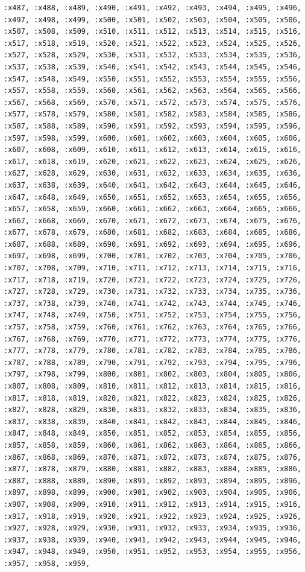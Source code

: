 \documentclass{article}
\begin{document}
\begin{lstlisting}
:x487, :x488, :x489, :x490, :x491, :x492, :x493, :x494, :x495, :x496, :x497, :x498, :x499, :x500, :x501, :x502, :x503, :x504, :x505, :x506, :x507, :x508, :x509, :x510, :x511, :x512, :x513, :x514, :x515, :x516, :x517, :x518, :x519, :x520, :x521, :x522, :x523, :x524, :x525, :x526, :x527, :x528, :x529, :x530, :x531, :x532, :x533, :x534, :x535, :x536, :x537, :x538, :x539, :x540, :x541, :x542, :x543, :x544, :x545, :x546, :x547, :x548, :x549, :x550, :x551, :x552, :x553, :x554, :x555, :x556, :x557, :x558, :x559, :x560, :x561, :x562, :x563, :x564, :x565, :x566, :x567, :x568, :x569, :x570, :x571, :x572, :x573, :x574, :x575, :x576, :x577, :x578, :x579, :x580, :x581, :x582, :x583, :x584, :x585, :x586, :x587, :x588, :x589, :x590, :x591, :x592, :x593, :x594, :x595, :x596, :x597, :x598, :x599, :x600, :x601, :x602, :x603, :x604, :x605, :x606, :x607, :x608, :x609, :x610, :x611, :x612, :x613, :x614, :x615, :x616, :x617, :x618, :x619, :x620, :x621, :x622, :x623, :x624, :x625, :x626, :x627, :x628, :x629, :x630, :x631, :x632, :x633, :x634, :x635, :x636, :x637, :x638, :x639, :x640, :x641, :x642, :x643, :x644, :x645, :x646, :x647, :x648, :x649, :x650, :x651, :x652, :x653, :x654, :x655, :x656, :x657, :x658, :x659, :x660, :x661, :x662, :x663, :x664, :x665, :x666, :x667, :x668, :x669, :x670, :x671, :x672, :x673, :x674, :x675, :x676, :x677, :x678, :x679, :x680, :x681, :x682, :x683, :x684, :x685, :x686, :x687, :x688, :x689, :x690, :x691, :x692, :x693, :x694, :x695, :x696, :x697, :x698, :x699, :x700, :x701, :x702, :x703, :x704, :x705, :x706, :x707, :x708, :x709, :x710, :x711, :x712, :x713, :x714, :x715, :x716, :x717, :x718, :x719, :x720, :x721, :x722, :x723, :x724, :x725, :x726, :x727, :x728, :x729, :x730, :x731, :x732, :x733, :x734, :x735, :x736, :x737, :x738, :x739, :x740, :x741, :x742, :x743, :x744, :x745, :x746, :x747, :x748, :x749, :x750, :x751, :x752, :x753, :x754, :x755, :x756, :x757, :x758, :x759, :x760, :x761, :x762, :x763, :x764, :x765, :x766, :x767, :x768, :x769, :x770, :x771, :x772, :x773, :x774, :x775, :x776, :x777, :x778, :x779, :x780, :x781, :x782, :x783, :x784, :x785, :x786, :x787, :x788, :x789, :x790, :x791, :x792, :x793, :x794, :x795, :x796, :x797, :x798, :x799, :x800, :x801, :x802, :x803, :x804, :x805, :x806, :x807, :x808, :x809, :x810, :x811, :x812, :x813, :x814, :x815, :x816, :x817, :x818, :x819, :x820, :x821, :x822, :x823, :x824, :x825, :x826, :x827, :x828, :x829, :x830, :x831, :x832, :x833, :x834, :x835, :x836, :x837, :x838, :x839, :x840, :x841, :x842, :x843, :x844, :x845, :x846, :x847, :x848, :x849, :x850, :x851, :x852, :x853, :x854, :x855, :x856, :x857, :x858, :x859, :x860, :x861, :x862, :x863, :x864, :x865, :x866, :x867, :x868, :x869, :x870, :x871, :x872, :x873, :x874, :x875, :x876, :x877, :x878, :x879, :x880, :x881, :x882, :x883, :x884, :x885, :x886, :x887, :x888, :x889, :x890, :x891, :x892, :x893, :x894, :x895, :x896, :x897, :x898, :x899, :x900, :x901, :x902, :x903, :x904, :x905, :x906, :x907, :x908, :x909, :x910, :x911, :x912, :x913, :x914, :x915, :x916, :x917, :x918, :x919, :x920, :x921, :x922, :x923, :x924, :x925, :x926, :x927, :x928, :x929, :x930, :x931, :x932, :x933, :x934, :x935, :x936, :x937, :x938, :x939, :x940, :x941, :x942, :x943, :x944, :x945, :x946, :x947, :x948, :x949, :x950, :x951, :x952, :x953, :x954, :x955, :x956, :x957, :x958, :x959, 
\end{lstlisting}
\end{document}

